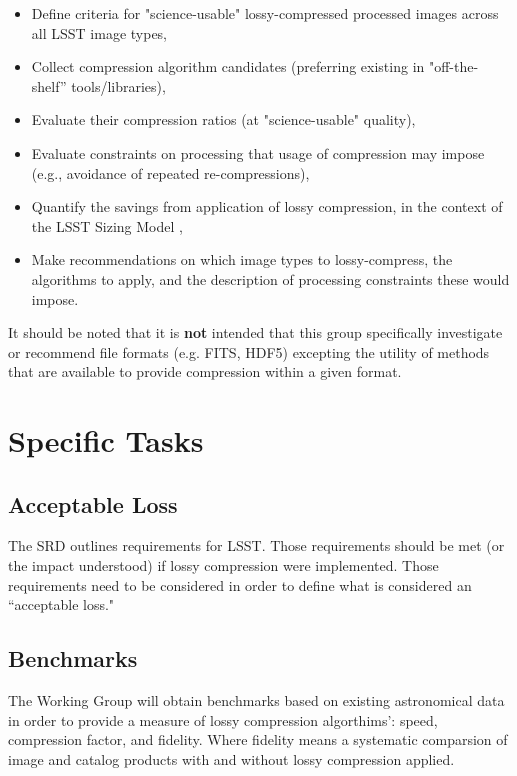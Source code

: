 \begin{itemize}
    \item Define criteria for "science-usable" lossy-compressed processed images across all LSST image types,
    \item Collect compression algorithm candidates (preferring existing in "off-the-shelf” tools/libraries),
    \item Evaluate their compression ratios (at "science-usable" quality),
    \item Evaluate constraints on processing that usage of compression may impose (e.g., avoidance of repeated re-compressions),
    \item Quantify the savings from application of lossy compression, in the context of the LSST Sizing Model ,
    \item Make recommendations on which image types to lossy-compress, the algorithms to apply, and the description of processing constraints these would impose.
\end{itemize}

It should be noted that it is \textbf{not} intended that this group specifically
investigate or recommend file formats (e.g. FITS, HDF5) excepting the utility
of methods that are available to provide compression within a given format.


\section{Specific Tasks}

\subsection{Acceptable Loss}

The SRD outlines requirements for LSST.  Those requirements should be met
(or the impact understood) if lossy compression were implemented.  Those
requirements need to be considered in order to define what is considered
an ``acceptable loss."

\subsection{Benchmarks}

The Working Group will obtain benchmarks based on existing astronomical data in order
to provide a measure of lossy compression algorthims': speed, compression factor,
and fidelity.  Where fidelity means a systematic comparsion of image and catalog
products with and without lossy compression applied.

